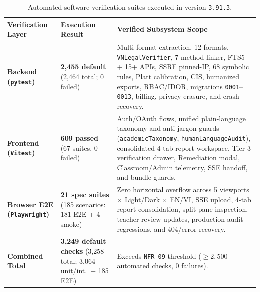 {\setlength{\tabcolsep}{3.5pt}
\begin{table}[!htbp]
\centering
\caption[Automated software verification suites (v3.91.3)]{Automated software verification suites executed in version \texttt{3.91.3}.}\label{tab:test-suites}
\begin{tabular}{|L{0.23}|L{0.26}|L{0.51}|}
\hline
\textbf{Verification Layer} & \textbf{Execution Result} & \textbf{Verified Subsystem Scope} \\
\hline
\textbf{Backend (\texttt{pytest})} & \textbf{2,455 default} (2,464 total; 0 failed) & Multi-format extraction, 12 formats, \texttt{VNLegalVerifier}, 7-method linker, FTS5 + 15+ APIs, SSRF pinned-IP, 68 symbolic rules, Platt calibration, CIS, humanized exports, RBAC/IDOR, migrations \texttt{0001}--\texttt{0013}, billing, privacy erasure, and crash recovery. \\
\hline
\textbf{Frontend (\texttt{Vitest})} & \textbf{609 passed} (67 suites, 0 failed) & Auth/OAuth flows, unified plain-language taxonomy and anti-jargon guards (\texttt{academicTaxonomy}, \texttt{humanLanguageAudit}), consolidated 4-tab report workspace, Tier-3 verification drawer, Remediation modal, Classroom/Admin telemetry, SSE handoff, and bundle guards. \\
\hline
\textbf{Browser E2E (\texttt{Playwright})} & \textbf{21 spec suites} (185 scenarios: 181 E2E + 4 smoke) & Zero horizontal overflow across 5 viewports $\times$ Light/Dark $\times$ EN/VI, SSE upload, 4-tab report consolidation, split-pane inspection, teacher review updates, production audit regressions, and 404/error recovery. \\
\hline
\textbf{Combined Total} & \textbf{3,249 default checks} (3,258 total; 3,064 unit/int.\ + 185 E2E) & Exceeds \texttt{NFR-09} threshold ($\ge 2{,}500$ automated checks, 0 failures). \\
\hline
\end{tabular}
\end{table}
}
\FloatBarrier

